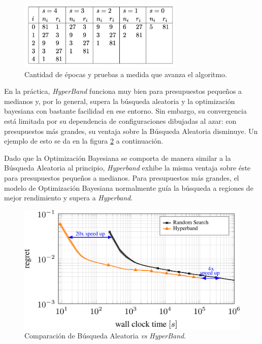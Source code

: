 \documentclass[a4paper,12pt]{article}
\begin{document}
\begin{figure}[H]
	\begin{center}
	\includegraphics[width=0.7\textwidth]{hyper_trials_vs_epochs.png}
  	\caption{Cantidad de épocas y pruebas a medida que avanza el algoritmo.}
  	\label{fig:hyper_epochs_trials}
  	\end{center}
\end{figure}

En la práctica, \textit{HyperBand} funciona muy bien para presupuestos pequeños a medianos y, por lo general, supera la búsqueda aleatoria y la optimización bayesiana con bastante facilidad en ese entorno. Sin embargo, su convergencia está limitada por su dependencia de configuraciones dibujadas al azar: con presupuestos más grandes, su ventaja sobre la Búsqueda Aleatoria disminuye. Un ejemplo de esto se da en la figura \ref{fig:rs_vs_hb} a continuación. \citep{automl-bohb}

Dado que la Optimización Bayesiana se comporta de manera similar a la Búsqueda Aleatoria al principio, \textit{Hyperband} exhibe la misma ventaja sobre éste para presupuestos pequeños a medianos. Para presupuestos más grandes, el modelo de Optimización Bayesiana normalmente guía la búsqueda a regiones de mejor rendimiento y supera a \textit{Hyperband}.

\begin{figure}[H]
	\begin{center}
	\includegraphics[width=1\textwidth]{comparison_rs_hb.png}
  	\caption{Comparación de Búsqueda Aleatoria \textit{vs} \textit{HyperBand}.}
  	\label{fig:rs_vs_hb}
  	\end{center}
\end{figure}
\end{document}
